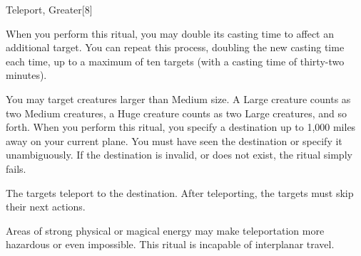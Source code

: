 \begin{spellsection}{Teleport, Greater}[8]
    \begin{spellheader}
    \end{spellheader}
    \begin{spellcontent}
        \begin{spelltargetinginfo}
        \end{spelltargetinginfo}
        \begin{spelleffects}

            \spellspecial When you perform this ritual, you may double its casting time to affect an additional target. You can repeat this process, doubling the new casting time each time, up to a maximum of ten targets (with a casting time of thirty-two minutes).

            You may target creatures larger than Medium size. A Large creature counts as two Medium creatures, a Huge creature counts as two Large creatures, and so forth.
            \spelleffect When you perform this ritual, you specify a destination up to 1,000 miles away on your current plane. You must have seen the destination or specify it unambiguously. If the destination is invalid, or does not exist, the ritual simply fails.

            The targets teleport to the destination. After teleporting, the targets must skip their next actions.

        \end{spelleffects}
    \end{spellcontent}
    \begin{spellfooter}
        \spellnotes Areas of strong physical or magical energy may make teleportation more hazardous or even impossible. This ritual is incapable of interplanar travel.
    \end{spellfooter}
\end{spellsection}


